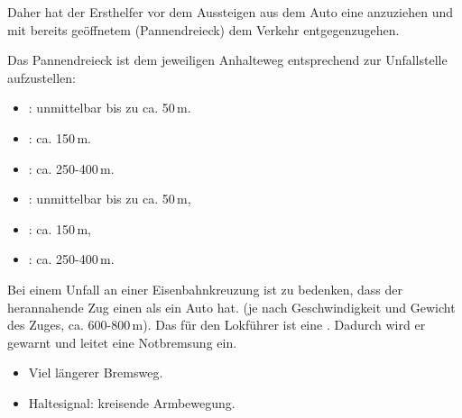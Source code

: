 
Daher hat der Ersthelfer vor dem Aussteigen aus dem Auto
eine  anzuziehen und mit bereits
geöffnetem  (Pannendreieck) dem 
Verkehr entgegenzugehen. 


{
Das Pannendreieck ist
dem jeweiligen Anhalteweg entsprechend zur Unfallstelle
aufzustellen:
\begin{itemize}
  \item {}: unmittelbar bis zu ca. 50\,m.
  \item {}: ca. 150\,m.
  \item {}: ca. 250-400\,m.
\end{itemize}
}{
\begin{itemize}
  \item {}: unmittelbar bis zu ca. 50\,m,
  \item {}: ca. 150\,m,
  \item {}: ca. 250-400\,m.
\end{itemize}
}{}{}{}

{
Bei einem Unfall an einer Eisenbahnkreuzung ist zu bedenken, dass der
herannahende Zug einen  als ein
Auto hat. (je nach Geschwindigkeit und
Gewicht des Zuges, ca. 600-800\,m). Das  für den Lokführer ist
eine . Dadurch wird er gewarnt und leitet 
eine Notbremsung ein.
}{
\begin{itemize}
  \item Viel längerer Bremsweg.
  \item Haltesignal: kreisende Armbewegung.
\end{itemize}
}{}{}{}





